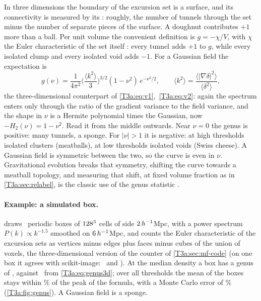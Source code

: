 In three dimensions the boundary of the excursion set is a surface, and its connectivity is measured by its : roughly, the number of tunnels through the set minus the number of separate pieces of the surface. A doughnut contributes $+1$ more than a ball. Per unit volume the convenient definition is $g=-\chi/V$, with $\chi$ the Euler characteristic of the set itself \cite{Pranav2017}: every tunnel adds $+1$ to $g$, while every isolated clump and every isolated void adds $-1$. For a Gaussian field the expectation is \cite{HamiltonGottWeinberg1986,Matsubara2003}
\begin{equation}
  g(\nu)=\frac{1}{4\pi^2}\Big(\frac{\langle k^2\rangle}{3}\Big)^{3/2}(1-\nu^2)\,e^{-\nu^2/2},
  \qquad \langle k^2\rangle=\frac{\langle|\nabla\delta|^2\rangle}{\langle\delta^2\rangle} ,
  \label{T3a:eq:genus3d}
\end{equation}
the three-dimensional counterpart of \eqref{T3a:eq:v1},~\eqref{T3a:eq:v2}: again the spectrum enters only through the ratio of the gradient variance to the field variance, and the shape in $\nu$ is a Hermite polynomial times the Gaussian, now $-H_2(\nu)=1-\nu^2$. Read it from the middle outwards. Near $\nu=0$ the genus is positive: many tunnels, a sponge. For $|\nu|>1$ it is negative: at high thresholds isolated clusters (meatballs), at low thresholds isolated voids (Swiss cheese). A Gaussian field is symmetric between the two, so the curve is even in $\nu$. Gravitational evolution breaks that symmetry, shifting the curve towards a meatball topology, and measuring that shift, at fixed volume fraction as in \cref{T3a:sec:relabel}, is the classic use of the genus statistic \cite{Matsubara2003}.

\paragraph{Example: a simulated box.}  draws \TeNs\ periodic boxes of $128^3$ cells of side $2\,h^{-1}$Mpc, with a power spectrum $P(k)\propto k^{-1.5}$ smoothed on $6\,h^{-1}$Mpc, and counts the Euler characteristic of the excursion sets as vertices minus edges plus faces minus cubes of the union of voxels, the three-dimensional version of the counter of \cref{T3a:sec:mf-code} (on one box it agrees with scikit-image: \TeEulerOurs\ and \TeEulerSkimage). At the median density a box has a genus of \TeGzeroSim, against \TeGzeroTh\ from \eqref{T3a:eq:genus3d}; over all thresholds the mean of the boxes stays within \TeDevPct\% of the peak of the formula, with a Monte Carlo error of \TeErrPct\% (\cref{T3a:fig:genus}). A Gaussian field is a sponge.

